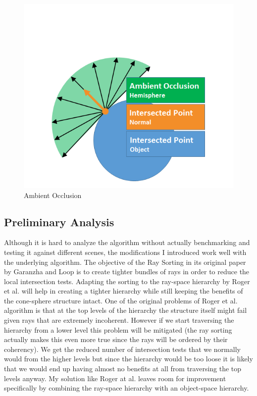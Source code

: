 \documentclass{llncs}
\begin{document}
\begin{figure}
\centering
\includegraphics[scale=0.40]{images/figure 15.png}
\caption{Ambient Occlusion}
\end{figure}

\vspace*{-20pt}

%
\subsection{Preliminary Analysis}
%

Although it is hard to analyze the algorithm without actually benchmarking and testing it against different scenes, the modifications I introduced work well with the underlying algorithm. The objective of the Ray Sorting in its original paper by Garanzha and Loop \cite{GaranzhaLoop10} is to create tighter bundles of rays in order to reduce the local intersection tests. Adapting the sorting to the ray-space hierarchy by Roger et al. \cite{Roger07} will help in creating a tighter hierarchy while still keeping the benefits of the cone-sphere structure intact. One of the original problems of Roger et al. \cite{Roger07} algorithm is that at the top levels of the hierarchy the structure itself might fail given rays that are extremely incoherent. However if we start traversing the hierarchy from a lower level this problem will be mitigated (the ray sorting actually makes this even more true since the rays will be ordered by their coherency). We get the  reduced number of intersection tests that we normally would from the higher levels but since the hierarchy would be too loose it is likely that we would end up having almost no benefits at all from traversing the top levels anyway. My solution like Roger at al. \cite{Roger07} leaves room for improvement specifically by combining the ray-space hierarchy with an object-space hierarchy.
\end{document}
